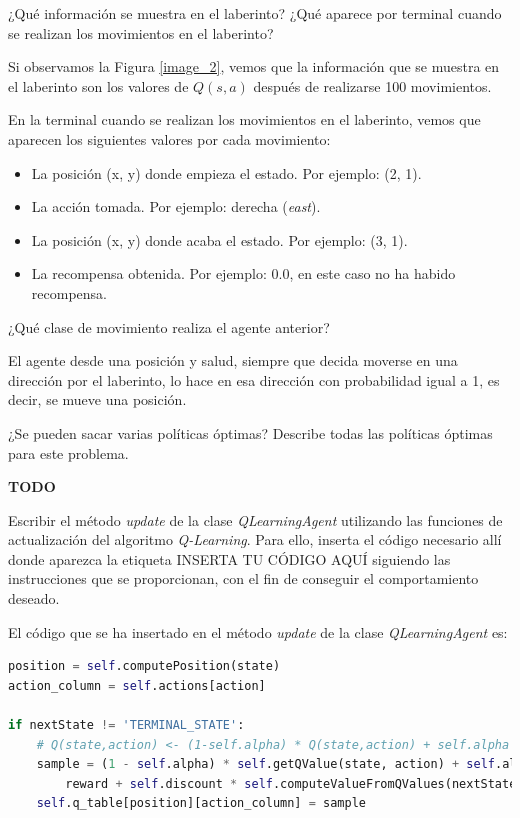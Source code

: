 \documentclass[11pt]{exam}
\begin{document}
\begin{questions}
{ \question ¿Qué información se muestra en el laberinto? ¿Qué aparece por terminal cuando se realizan los movimientos en el laberinto? 
}

Si observamos la Figura \ref{image_2}, vemos que la información que se muestra en el laberinto son los valores de $Q(s,a)$ después de realizarse 100 movimientos. 

\newpage

En la terminal cuando se realizan los movimientos en el laberinto, vemos que aparecen los siguientes valores por cada movimiento:

\begin{itemize}
	\item La posición (x, y) donde empieza el estado. Por ejemplo: (2, 1).
	\item La acción tomada. Por ejemplo: derecha (\textit{east}).
	\item La posición (x, y) donde acaba el estado. Por ejemplo: (3, 1).
	\item La recompensa obtenida. Por ejemplo: 0.0, en este caso no ha habido recompensa.
\end{itemize}

{ \question ¿Qué clase de movimiento realiza el agente anterior?}

El agente desde una posición y salud, siempre que decida moverse en una dirección por el laberinto, lo hace en esa dirección con probabilidad igual a 1, es decir, se mueve una posición.

{ \question ¿Se pueden sacar varias políticas óptimas? Describe todas las políticas óptimas para este problema.} 

\textbf{TODO}

{ \question Escribir el método \textit{update} de la clase \textit{QLearningAgent} utilizando las funciones de actualización del algoritmo \textit{Q-Learning}. Para ello, inserta el código necesario allí donde aparezca la etiqueta INSERTA TU CÓDIGO AQUÍ siguiendo las instrucciones que se proporcionan, con el fin de conseguir el comportamiento deseado. }

El código que se ha insertado en el método \textit{update} de la clase \textit{QLearningAgent} es:

\begin{lstlisting}[language=Python]
position = self.computePosition(state)
action_column = self.actions[action]

if nextState != 'TERMINAL_STATE':
	# Q(state,action) <- (1-self.alpha) * Q(state,action) + self.alpha * (reward + self.discount * max a' Q(nextState, a'))
	sample = (1 - self.alpha) * self.getQValue(state, action) + self.alpha * (
		reward + self.discount * self.computeValueFromQValues(nextState))
	self.q_table[position][action_column] = sample


\end{lstlisting}
\end{questions}
\end{document}
